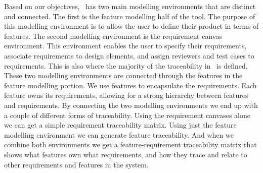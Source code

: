 Based on our objectives, \tool\ has two main modelling environments that are distinct and connected. The first is the feature modelling half of the tool. The purpose of this modelling environment is to allow the user to define their product in terms of features. The second modelling environment is the requirement canvas environment. This environment enables the user to specify their requirements, associate requirements to design elements, and assign reviewers and test cases to requirements. This is also where the majority of the traceability in \tool\ is defined. These two modelling environments are connected through the features in the feature modelling portion. We use features to encapsulate the requirements. Each feature owns its requirements, allowing for a strong hierarchy between features and requirements. By connecting the two modelling environments we end up with a couple of different forms of traceability. Using the requirement canvases alone we can get a simple requirement traceability matrix. Using just the feature modelling environment we can generate feature traceability. And when we combine both environments we get a feature-requirement traceability matrix that shows what features own what requirements, and how they trace and relate to other requirements and features in the system. 


